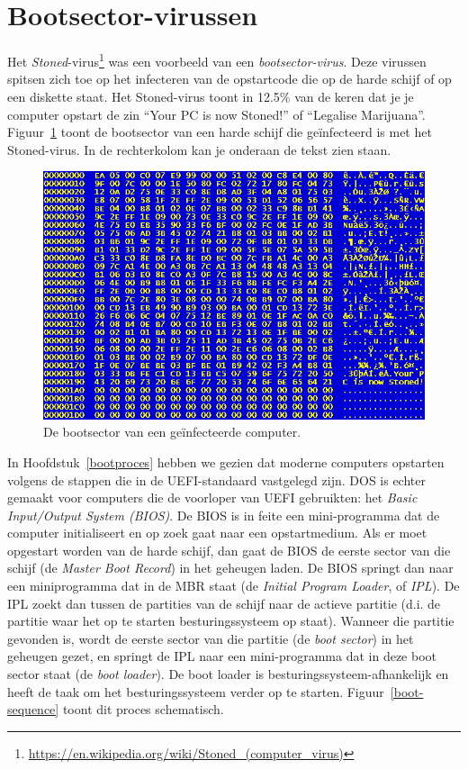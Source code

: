 \section{Bootsector-virussen}

Het \emph{Stoned}-virus\footnote{\url{https://en.wikipedia.org/wiki/Stoned_(computer_virus)}} was een voorbeeld van een \emph{bootsector-virus}. Deze virussen spitsen zich toe op het infecteren van de opstartcode die op de harde schijf of op een diskette staat. Het Stoned-virus toont in 12.5\% van de keren dat je je computer opstart de zin ``Your PC is now Stoned!'' of ``Legalise Marijuana''. Figuur~\ref{stoned} toont de bootsector van een harde schijf die ge\"infecteerd is met het Stoned-virus. In de rechterkolom kan je onderaan de tekst zien staan.

\begin{figure}
\begin{center}
\includegraphics[width=120mm]{images/stoned.png}
\end{center}
\caption{De bootsector van een ge\"infecteerde computer.}
\label{stoned}
\end{figure}

In Hoofdstuk~\ref{bootproces} hebben we gezien dat moderne computers opstarten volgens de stappen die in de UEFI-standaard vastgelegd zijn. DOS is echter gemaakt voor computers die de voorloper van UEFI gebruikten: het \emph{Basic Input/Output System (BIOS)}. De BIOS is in feite een mini-programma dat de computer initialiseert en op zoek gaat naar een opstartmedium. Als er moet opgestart worden van de harde schijf, dan gaat de BIOS de eerste sector van die schijf (de \emph{Master Boot Record}) in het geheugen laden. De BIOS springt dan naar een miniprogramma dat in de MBR staat (de \emph{Initial Program Loader}, of \emph{IPL}). De IPL zoekt dan tussen de partities van de schijf naar de actieve partitie (d.i. de partitie waar het op te starten besturingssysteem op staat). Wanneer die partitie gevonden is, wordt de eerste sector van die partitie (de \emph{boot sector}) in het geheugen gezet, en springt de IPL naar een mini-programma dat in deze boot sector staat (de \emph{boot loader}). De boot loader is besturingssysteem-afhankelijk en heeft de taak om het besturingssysteem verder op te starten. Figuur~\ref{boot-sequence} toont dit proces schematisch.

